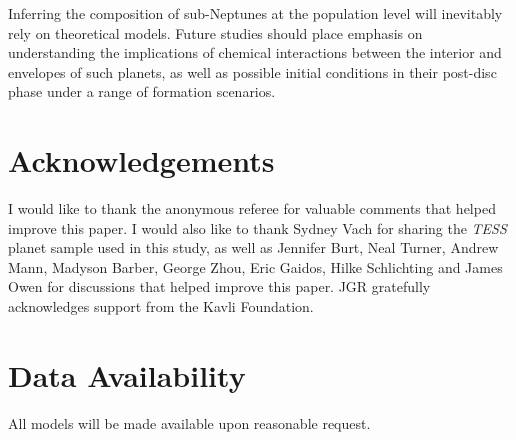 \documentclass[fleqn,usenatbib]{mnras}
\begin{document}
Inferring the composition of sub-Neptunes at the population level will inevitably rely on theoretical models. Future studies should place emphasis on understanding the implications of chemical interactions between the interior and envelopes of such planets, as well as possible initial conditions in their post-disc phase under a range of formation scenarios.


\section*{Acknowledgements}
I would like to thank the anonymous referee for valuable comments that helped improve this paper. I would also like to thank Sydney Vach for sharing the \textit{TESS} planet sample used in this study, as well as Jennifer Burt, Neal Turner, Andrew Mann, Madyson Barber, George Zhou, Eric Gaidos, Hilke Schlichting and James Owen for discussions that helped improve this paper. JGR gratefully acknowledges support from the Kavli Foundation.
\section*{Data Availability}

 
All models will be made available upon reasonable request.

















\bsp	%
\label{lastpage}
\end{document}

